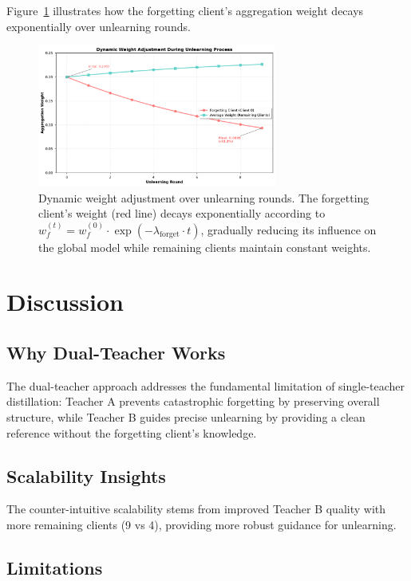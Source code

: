 \documentclass[11pt,a4paper]{article}
\begin{document}
Figure~\ref{fig:weights} illustrates how the forgetting client's aggregation weight decays exponentially over unlearning rounds.

\begin{figure}[htbp]
\centering
\includegraphics[width=0.7\textwidth]{figures/figure4_dynamic_weights.pdf}
\caption{Dynamic weight adjustment over unlearning rounds. The forgetting client's weight (red line) decays exponentially according to $w_f^{(t)} = w_f^{(0)} \cdot \exp(-\lambda_{\text{forget}} \cdot t)$, gradually reducing its influence on the global model while remaining clients maintain constant weights.}
\label{fig:weights}
\end{figure}

\section{Discussion}

\subsection{Why Dual-Teacher Works}

The dual-teacher approach addresses the fundamental limitation of single-teacher distillation: Teacher A prevents catastrophic forgetting by preserving overall structure, while Teacher B guides precise unlearning by providing a clean reference without the forgetting client's knowledge.

\subsection{Scalability Insights}

The counter-intuitive scalability stems from improved Teacher B quality with more remaining clients (9 vs 4), providing more robust guidance for unlearning.

\subsection{Limitations}
\end{document}
